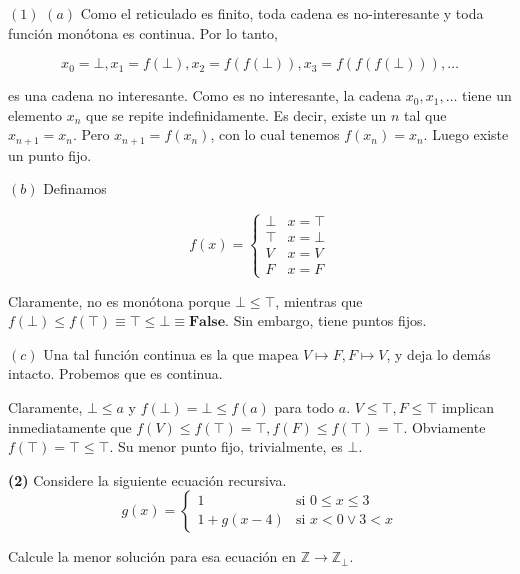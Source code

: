 \documentclass[a4paper, 12pt]{article}
\begin{document}
\pagebreak 

$(1)$ $(a)$ Como el reticulado es finito, toda cadena es no-interesante y toda función
monótona es continua. Por lo tanto, 

\begin{equation*}
  x_0 = \bot, x_1 = f(\bot ), x_2 = f(f(\bot )), x_3 = f(f(f(\bot ))), \ldots
\end{equation*}

es una cadena no interesante. Como es no interesante, la cadena $x_0, x_1,
\ldots$ tiene un elemento $x_n$ que se repite indefinidamente. Es decir, existe
un $n$ tal que $x_{n+1} = x_n$. Pero $x_{n+1} = f(x_n)$, con lo cual tenemos
$f(x_n) = x_n$. Luego existe un punto fijo.

$(b)$ Definamos 

\begin{equation*}
  f(x) = \begin{cases}
    \bot & x = \top \\ 
    \top & x = \bot \\ 
    V & x = V \\ 
    F & x = F
  \end{cases}
\end{equation*}

Claramente, no es monótona porque $\bot \leq \top$, mientras que $f(\bot) \leq
f(\top) \equiv \top \leq \bot \equiv \textbf{False}$. Sin embargo, tiene puntos
fijos.

$(c)$ Una tal función continua es la que mapea $V \mapsto F, F\mapsto V$, y deja
lo demás intacto. Probemos que es continua. 

Claramente, $\bot \leq a$ y $f(\bot) = \bot \leq f(a)$ para todo $a$. $V \leq
\top, F \leq \top$ implican inmediatamente que $f(V) \leq f(\top) = \top, f(F) \leq
f(\top) = \top$. Obviamente $f(\top) = \top \leq \top$. Su menor punto fijo,
trivialmente, es $\bot $.

\pagebreak 

\begin{myframe}
  
    \textbf{(2)} Considere la siguiente ecuación recursiva.
    \[
    g(x) = 
    \begin{cases}
        1 & \text{si } 0 \leq x \leq 3 \\
        1 + g(x - 4) & \text{si } x < 0 \lor 3 < x
    \end{cases}
    \]

    Calcule la menor solución para esa ecuación en $\mathbb{Z} \rightarrow \mathbb{Z}_{\bot}$.

\end{myframe}
\end{document}
